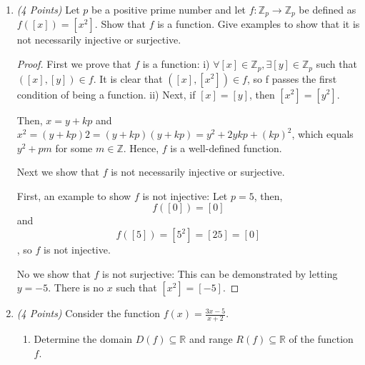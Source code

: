 \documentclass[10pt]{article} %
\newcommand{\Z}{\mathbb{Z}}
\newcommand{\R}{\mathbb{R}}
\newcommand{\points}[1]{{\it (#1 Points)}}
\begin{document}
\begin{enumerate}

\begin{proof} Let $[a],[b],[c],[d] \in \Z_n$, where $[a]=[b]$ and $[c]=[d]$.  Now we prove that [ac]=[bd].  It follows that $a \equiv c$ (mod n) and $b \equiv d$ (mod n).  Thus, $ab \equiv cd$ (mod n) from result 4.11.  So, we can conclude that $ab R cd$ which implies that $[ab]=[cd]$.  Hence, multiplication in $\Z_n$ is well-defined.  
\end{proof}

\item \points{4} Let $p$ be a positive prime number and let $f: \Z_p\to \Z_p$ be
  defined as $f([x])=[x^2]$.  Show that $f$ is a function.  Give
  examples to show that it is not necessarily injective or surjective.  
  
  \begin{proof} First we prove that $f$ is a function:
  i) $\forall [x] \in \Z_p, \exists [y] \in \Z_p$ such that $([x],[y])\in f$.  It is clear that $([x],[x^2]) \in f$, so f passes the first condition of being a function.  
  ii) Next, if $[x]=[y]$, then $[x^2]=[y^2]$.  
  
  Then, $x=y+kp$ and $x^2=(y+kp)2=(y+kp)(y+kp)=y^2+2ykp+(kp)^2$, which equals $y^2+pm$ for some $m\in \Z$.  Hence, $f$ is a well-defined function.  
  
  
  
  Next we show that $f$ is not necessarily injective or surjective.  
  
  First, an example to show $f$ is not injective: Let $p=5$, then, 
  $$f([0])=[0]$$ and $$f([5])=[5^2]=[25]=[0]$$, so $f$ is not injective.  
  
  No we show that $f$ is not surjective:
  This can be demonstrated by letting $y=-5$.  There is no $x$ such that $[x^2]=[-5]$.    
  \end{proof}
  
  


\item \points{4}   Consider the function $f(x)=\displaystyle\frac{3x-5}{x+2}$.
    \begin{enumerate}
      \item Determine the domain $D(f)\subseteq \R$ and range $R(f)\subseteq \R$ of the function $f$.
      

\end{enumerate}
\end{enumerate}
\end{document}
